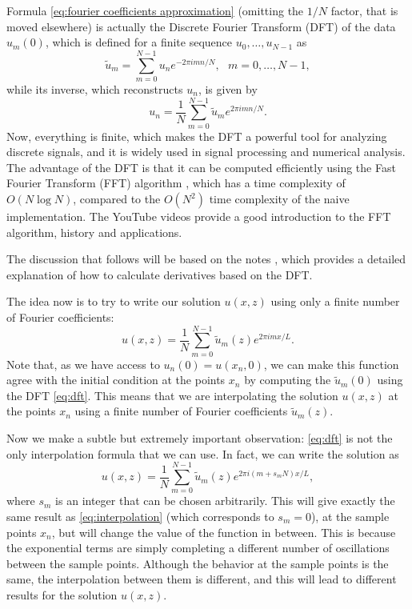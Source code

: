 \documentclass[a4paper,10pt]{report}
\begin{document}
Formula \eqref{eq:fourier coefficients approximation} (omitting the $1/N$ factor, that is moved elsewhere) is actually the Discrete Fourier Transform (DFT) of the data $u_m(0)$, which is defined for a finite sequence $u_0, \ldots, u_{N-1}$ as
\begin{equation}
    \label{eq:dft}
    \tilde{u}_m = \sum_{m=0}^{N-1} u_n e^{-2\pi i mn/N}, \ \ \ m = 0, \ldots, N-1,
\end{equation}
while its inverse, which reconstructs $u_n$, is given by
\begin{equation}
    u_n = \frac{1}{N} \sum_{m=0}^{N-1} \tilde{u}_m e^{2\pi i mn/N}.
\end{equation}
Now, everything is finite, which makes the DFT a powerful tool for analyzing discrete signals, and it is widely used in signal processing and numerical analysis. The advantage of the DFT is that it can be computed efficiently using the Fast Fourier Transform (FFT) algorithm \cite{cooley1965algorithm}, which has a time complexity of $O(N \log N)$, compared to the $O(N^2)$ time complexity of the naive implementation. The YouTube videos \cite{fft_veritasium, fft_reducible} provide a good introduction to the FFT algorithm, history and applications.

The discussion that follows will be based on the notes \cite{fftderiv}, which provides a detailed explanation of how to calculate derivatives based on the DFT.

The idea now is to try to write our solution $u(x,z)$ using only a finite number of Fourier coefficients:
\begin{equation}
\label{eq:interpolation}
    u(x,z) = \frac{1}{N}\sum_{m=0}^{N-1} \tilde{u}_m(z) e^{2\pi i m x/L}.
\end{equation}
Note that, as we have access to $u_n(0) = u(x_n, 0)$, we can make this function agree with the initial condition at the points $x_n$ by computing the $\tilde{u}_m(0)$ using the DFT \eqref{eq:dft}. This means that we are interpolating the solution $u(x,z)$ at the points $x_n$ using a finite number of Fourier coefficients $\tilde{u}_m(z)$.

Now we make a subtle but extremely important observation: \eqref{eq:dft} is not the only interpolation formula that we can use. In fact, we can write the solution as
\begin{equation}
\label{eq:interpolation2}
    u(x,z) = \frac{1}{N}\sum_{m=0}^{N-1} \tilde{u}_m(z) e^{2\pi i (m + s_m N) x/L},
\end{equation}
where $s_m$ is an integer that can be chosen arbitrarily. This will give exactly the same result as \eqref{eq:interpolation} (which corresponds to $s_m = 0$), at the sample points $x_n$, but will change the value of the function in between. This is because the exponential terms are simply completing a different number of oscillations between the sample points. Although the behavior at the sample points is the same, the interpolation between them is different, and this will lead to different results for the solution $u(x,z)$.
\end{document}

